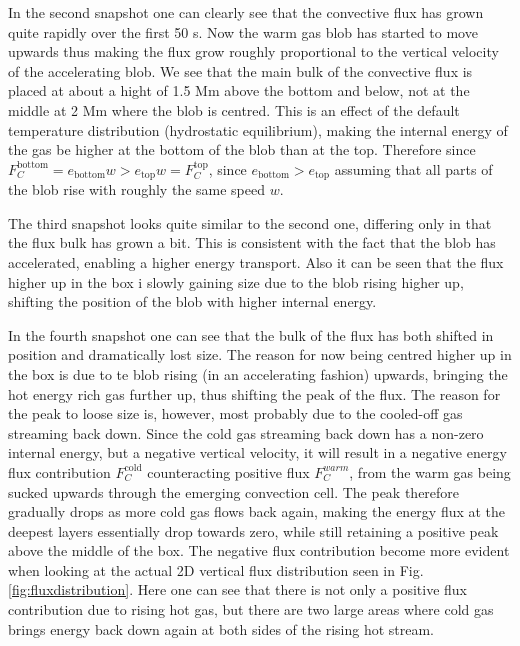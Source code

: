 \documentclass{emulateapj}
\begin{document}
	In the second snapshot one can clearly see that the convective flux has grown quite rapidly over the first 50 s. Now the warm gas blob has started to move upwards thus making the flux grow roughly proportional to the vertical velocity of the accelerating blob. We see that the main bulk of the convective flux is placed at about a hight of 1.5 Mm above the bottom and below, not at the middle at 2 Mm where the blob is centred. This is an effect of the default temperature distribution (hydrostatic equilibrium), making the internal energy of the gas be higher at the bottom of the blob than at the top. Therefore since $F^\text{bottom}_{C} = e_\text{bottom} w > e_\text{top} w = F^\text{top}_C$, since $e_\text{bottom}>e_\text{top}$ assuming that all parts of the blob rise with roughly the same speed $w$.
	
	The third snapshot looks quite similar to the second one, differing only in that the flux bulk has grown a bit. This is consistent with the fact that the blob has accelerated, enabling a higher energy transport. Also it can be seen that the flux higher up in the box i slowly gaining size due to the blob rising higher up, shifting the position of the blob with higher internal energy. 
	
	In the fourth snapshot one can see that the bulk of the flux has both shifted in position and dramatically lost size. The reason for now being centred higher up in the box is due to te blob rising (in an accelerating fashion) upwards, bringing the hot energy rich gas further up, thus shifting the peak of the flux. The reason for the peak to loose size is, however, most probably due to the cooled-off gas streaming back down. Since the cold gas streaming back down has a non-zero internal energy, but a negative vertical velocity, it will result in a negative energy flux contribution $F_C^\text{cold}$ counteracting positive flux $F_C^{warm}$, from the warm gas being sucked upwards through the emerging convection cell. The peak therefore gradually drops as more cold gas flows back again, making the energy flux at the deepest layers essentially drop towards zero, while still retaining a positive peak above the middle of the box. The negative flux contribution become more evident when looking at the actual 2D vertical flux distribution seen in Fig. \ref{fig:fluxdistribution}. Here one can see that there is not only a positive flux contribution due to rising hot gas, but there are two large areas where cold gas brings energy back down again at both sides of the rising hot stream. 
	
\end{document}

